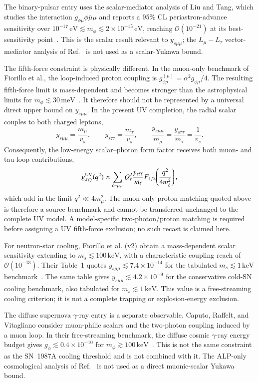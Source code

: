 \documentclass[onecolumn, aps, nofootinbib, prd, preprint, floats, floatfix, amsmath, amssymb, superscriptaddress, preprintnumbers]{revtex4-2}
\begin{document}
The binary-pulsar entry uses the scalar-mediator analysis of Liu and Tang, which studies the interaction $g_{\phi\mu}\phi\bar\mu\mu$ and reports a 95\% CL periastron-advance sensitivity over $10^{-17}\,\mathrm{eV}\lesssim m_\phi\lesssim2\times10^{-15}\,\mathrm{eV}$, reaching $\mathcal{O}(10^{-21})$ at its best-sensitivity point~\cite{Liu:2025zuz}. This is the scalar result relevant to $y_{s\mu\mu}$; the $L_\mu-L_\tau$ vector-mediator analysis of Ref.~\cite{Dror:2019uea} is not used as a scalar-Yukawa bound.

The fifth-force constraint is physically different. In the muon-only benchmark of Fiorillo et al., the loop-induced proton coupling is $g_{\phi p}^{(\mu)}=\alpha^2g_{\phi\mu}/4$. The resulting fifth-force limit is mass-dependent and becomes stronger than the astrophysical limits for $m_\phi\lesssim30\,\mathrm{meV}$~\cite{Fiorillo:2026wso}. It therefore should not be represented by a universal direct upper bound on $y_{s\mu\mu}$. In the present UV completion, the radial scalar couples to both charged leptons,
\[
y_{s\mu\mu}=\frac{m_\mu}{v_s},\qquad
y_{s\tau\tau}=\frac{m_\tau}{v_s},\qquad
\frac{y_{s\mu\mu}}{m_\mu}=\frac{y_{s\tau\tau}}{m_\tau}=\frac{1}{v_s}.
\]
Consequently, the low-energy scalar--photon form factor receives both muon- and tau-loop contributions,
\[
g_{s\gamma\gamma}^{\rm UV}(q^2)\propto
\sum_{\ell=\mu,\tau}Q_\ell^2\frac{y_{s\ell\ell}}{m_\ell}
F_{1/2}\!\left(\frac{q^2}{4m_\ell^2}\right),
\]
which add in the limit $q^2\ll4m_\mu^2$. The muon-only proton matching quoted above is therefore a source benchmark and cannot be transferred unchanged to the complete UV model. A model-specific two-photon/proton matching is required before assigning a UV fifth-force exclusion; no such recast is claimed here.

For neutron-star cooling, Fiorillo et al. (v2) obtain a mass-dependent scalar sensitivity extending to $m_s\lesssim100\,\mathrm{keV}$, with a characteristic coupling reach of $\mathcal{O}(10^{-13})$. Their Table~1 quotes $y_{s\mu\mu}\lesssim7.4\times10^{-14}$ for the tabulated $m_s\lesssim1\,\mathrm{keV}$ benchmark~\cite{Fiorillo:2026wso}. The same table gives $y_{s\mu\mu}\lesssim4.2\times10^{-9}$ for the conservative cold-SN cooling benchmark, also tabulated for $m_s\lesssim1\,\mathrm{keV}$. This value is a free-streaming cooling criterion; it is not a complete trapping or explosion-energy exclusion.

The diffuse supernova $\gamma$-ray entry is a separate observable. Caputo, Raffelt, and Vitagliano consider muon-philic scalars and the two-photon coupling induced by a muon loop. In their free-streaming benchmark, the diffuse cosmic $\gamma$-ray energy budget gives $g_\phi\lesssim0.4\times10^{-10}$ for $m_\phi\gtrsim100\,\mathrm{keV}$~\cite{Caputo:2021rux}. This is not the same constraint as the SN~1987A cooling threshold and is not combined with it. The ALP-only cosmological analysis of Ref.~\cite{Balazs:2022tjl} is not used as a direct muonic-scalar Yukawa bound.
\end{document}
